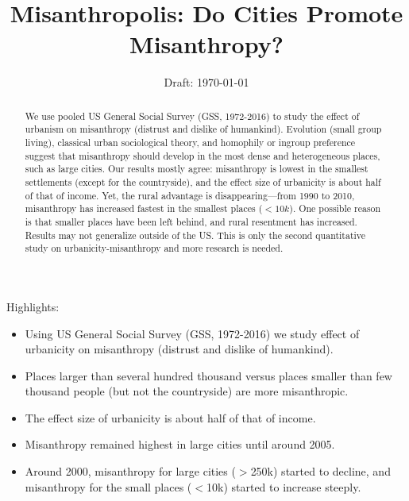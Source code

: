 \documentclass[11pt, letterpaper]{article}
\date{Draft: {}\today}
\title{  %
\vspace{-.5in}  Misanthropolis: Do Cities Promote Misanthropy?
%
}
\author{
}
\begin{document}


\maketitle
\vspace{-.4in}
\begin{center}

\end{center}


Highlights:
\begin{itemize}
\item Using US General Social Survey (GSS, 1972-2016) we study effect of
  urbanicity on misanthropy (distrust and dislike of humankind).
\item  Places larger than several hundred thousand  versus  places smaller than
  few thousand people (but not the countryside) are more misanthropic.
\item The effect size of urbanicity is about half of that of
 income.
\item Misanthropy remained highest in large cities until around 2005.
\item Around 2000, misanthropy for large cities ($>$250k) started to decline,
  and misanthropy for the small places ($<$10k) started to increase steeply.
\end{itemize}


\begin{abstract}
\noindent 
We use pooled US General Social Survey (GSS, 1972-2016)  to study  
the effect of urbanism on misanthropy (distrust and dislike of humankind). 
Evolution  (small group living),  classical urban sociological theory, and 
homophily or ingroup preference suggest that misanthropy should develop in the most dense and
heterogeneous places, such as large cities. Our results mostly agree:  misanthropy is lowest in the smallest settlements (except for the countryside), and the effect size of urbanicity is about half of that of
 income. 
Yet, the rural advantage is disappearing---from 1990 to  2010, misanthropy has
increased fastest in the smallest places ($<10k$). One possible reason  is that smaller places have been left behind, and rural resentment has increased. Results may not 
generalize outside of the US. This is only the second quantitative study on urbanicity-misanthropy and more research is needed.
\end{abstract}
\end{document}
